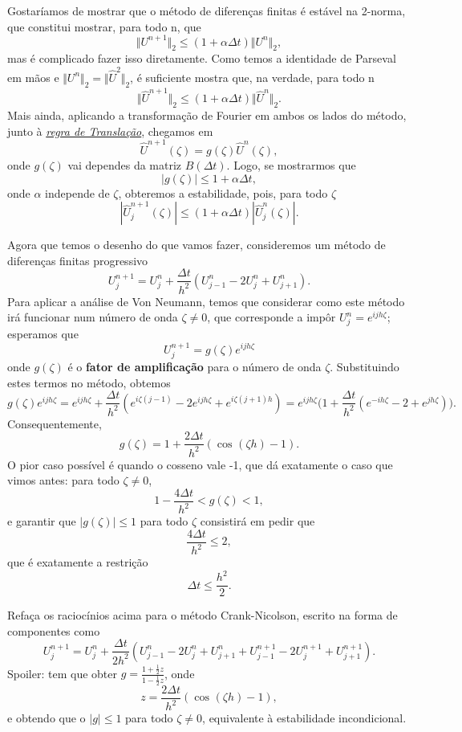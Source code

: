 \documentclass[../differential_methods.tex]{subfiles}
\begin{document}
Gostaríamos de mostrar que o método de diferenças finitas é estável na 2-norma, que constitui mostrar, para todo n, que
\[
	\Vert U^{n+1} \Vert_{2} \leq (1+\alpha \Delta t) \Vert U^{n} \Vert_{2},
\]
mas é complicado fazer isso diretamente. Como temos a identidade de Parseval em mãos e \(\Vert U^{n} \Vert_{2} = \Vert \hat{U}^{2} \Vert_{2}\), é suficiente mostra que, na verdade, para todo n
\[
	\Vert \hat{U}^{n+1} \Vert_{2} \leq (1+\alpha \Delta t) \Vert \hat{U}^{n} \Vert_{2}.
\]
Mais ainda, aplicando a transformação de Fourier em ambos os lados do método, junto à \hyperlink{translation_rule}{\textit{regra de Translação}}, chegamos em
\[
	\hat{U}^{n+1}(\zeta ) = g(\zeta )\hat{U}^{n}(\zeta ),
\]
onde \(g(\zeta )\) vai dependes da matriz \(B(\Delta t)\). Logo, se mostrarmos que
\[
	| g(\zeta ) | \leq 1 + \alpha \Delta t,
\]
onde \(\alpha \) independe de \(\zeta \), obteremos a estabilidade, pois, para todo \(\zeta \)
\[
	| \hat{U}_{j}^{n+1}(\zeta ) | \leq (1+\alpha \Delta t)| \hat{U}_{j}^{n}(\zeta ) |.
\]

Agora que temos o desenho do que vamos fazer, consideremos um método de diferenças finitas progressivo
\[
	U_{j}^{n+1} = U_{j}^{n} + \frac{\Delta t}{h^{2}}(U_{j-1}^{n} - 2 U_{j}^{n} + U_{j+1}^{n}).
\]
Para aplicar a análise de Von Neumann, temos que considerar como este método irá funcionar num número de onda \(\zeta \neq 0\), que corresponde a impôr \(U_{j}^{n} = e^{ijh\zeta }\); esperamos que
\[
	\boxed{U_{j}^{n+1} = g(\zeta )e^{ijh\zeta }}
\]
onde \(g(\zeta )\) é o \textbf{fator de amplificação} para o número de onda \(\zeta \). Substituindo estes termos no método, obtemos
\[
	g(\zeta )e^{ijh\zeta } = e^{ijh\zeta } + \frac{\Delta t}{h^{2}}(e^{i\zeta (j-1)} -2e^{ijh\zeta } + e^{i\zeta (j+1)h}) = e^{ijh\zeta }\biggl(1 + \frac{\Delta t}{h^{2}}(e^{-ih\zeta }-2 + e^{jh\zeta })\biggr).
\]
Consequentemente,
\[
	g(\zeta ) = 1 + \frac{2\Delta t}{h^{2}}(\cos^{}{(\zeta h)}-1).
\]
O pior caso possível é quando o cosseno vale -1, que dá exatamente o caso que vimos antes: para todo \(\zeta \neq 0\),
\[
	1 - \frac{4\Delta t}{h^{2}} < g(\zeta ) < 1,
\]
e garantir que \(| g(\zeta ) |\leq 1\) para todo \(\zeta \) consistirá em pedir que
\[
	\frac{4\Delta t}{h^{2}} \leq 2,
\]
que é exatamente a restrição
\[
	\Delta t \leq \frac{h^{2}}{2}.
\]
\begin{exr}
	Refaça os raciocínios acima para o método Crank-Nicolson, escrito na forma de componentes como
	\[
		U_{j}^{n+1} = U_{j}^{n} + \frac{\Delta t}{2h^{2}} (U_{j-1}^{n} - 2U_{j}^{n} + U_{j+1}^{n} + U_{j-1}^{n+1} - 2U_{j}^{n+1} + U_{j+1}^{n+1}).
	\]
	Spoiler: tem que obter \(\displaystyle g = \frac{1+\frac{1}{2}z}{1-\frac{1}{2}z}\), onde
	\[
		z = \frac{2\Delta t}{h^{2}}(\cos^{}{(\zeta h)}-1),
	\]
	e obtendo que o \(| g | \leq 1\) para todo \(\zeta \neq 0\), equivalente à estabilidade incondicional.
\end{exr}
\end{document}

